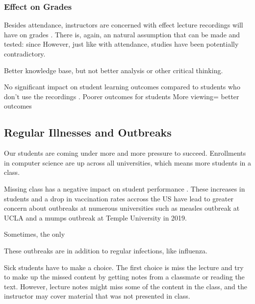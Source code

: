 \documentclass[sigconf]{acmart}
\begin{document}
\subsubsection{Effect on Grades}
Besides attendance, instructors are concerned with effect lecture recordings will have on grades \cite{maynor2013student}.
There is, again, an natural assumption that can be made and tested: since
However, just like with attendance, studies have been potentially contradictory.

Better knowledge base, but not better analysis or other critical thinking.\cite{bos2016use}



No significant impact on student learning outcomes compared to students who don't use the recordings \cite{leadbeater2013evaluating}.
Poorer outcomes for students \cite{johnston2013digital}
More viewing= better outcomes 
\cite{traphagan2010impact}
\subsection{Regular Illnesses and Outbreaks}
Our students are coming under more and more pressure to succeed.  
Enrollments in computer science are up across all universities, which means more students in a class. 

Missing class has a negative impact on student performance \cite{traphagan2010impact}.
These increases in students and a drop in vaccination rates accross the US have lead to greater concern about outbreaks at numerous universities such as measles outbreak at UCLA \cite{uclameas} and a mumps outbreak at Temple University \cite{emezienna2019resurgence} in 2019.

Sometimes, the only 

These outbreaks are in addition to regular infections, like influenza. 


Sick students have to make a choice. 
The first choice is miss the lecture and try to make up the missed content by getting notes from a classmate or reading the text.
However, lecture notes might miss some of the content in the class, and the instructor may cover material that was not presented in class.

\end{document}
